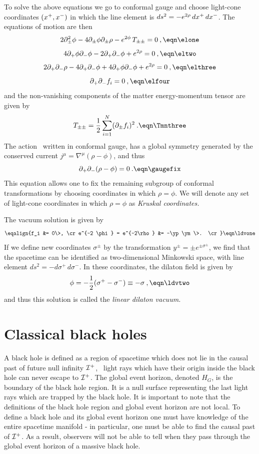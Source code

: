 To solve the above equations we go to conformal gauge and choose
light-cone
coordinates $(x^+,x^-)$ in which the line element is $ds^2 = -e^{2
\rho}\, dx^+ \, dx^-$.  The equations of motion are then
$$
2\pa_{\pm}^2 \phi
- 4\pa_{\pm} \phi\pa_{\pm} \rho
- e^{2 \phi}\, T_{\pm \pm} = 0  \>,
\eqn\elone
$$
$$
 4\pa_+ \phi\pa_- \phi
- 2 \pa_+ \pa_- \phi + e^{2 \rho} = 0  \>,
\eqn\eltwo
$$
$$
2 \pa_+ \pa_- \rho - 4 \pa_+ \pa_- \phi
+ 4\pa_+ \phi\pa_- \phi
+ e^{2 \rho} = 0  \>,
\eqn\elthree
$$
$$
\pa_+ \pa_- f_i = 0  \>,
\eqn\elfour
$$
and the non-vanishing components of the matter energy-momentum tensor
are given by
$$
T_{\pm \pm} = \half \sum_{i=1}^N (\pa_{\pm} f_i)^2  \>.
\eqn\Tmnthree
$$
The action \scghs\ written in conformal gauge, has a global symmetry
generated by the conserved current $j^{\mu} = \nabla^{\mu} (\rho -
\phi)$, and thus
$$
\pa_+ \pa_- (\rho - \phi) = 0  \>.
\eqn\gaugefix
$$
This equation allows one to fix the remaining subgroup of conformal
transformations by choosing coordinates in which $\rho = \phi.$  We
will denote any set of light-cone coordinates in which $\rho = \phi$
as {\it Kruskal coordinates.}

The vacuum solution is given by
$$
\eqalign{f_i &= 0\>, \cr
e^{-2 \phi} = e^{-2\rho} &= -\yp \ym\>. \cr}
\eqn\ldvone
$$
If we define new coordinates $\sigma^{\pm}$ by the transformation
$y^{\pm}=\pm e^{\pm \sigma^{\pm}}$, we find that the spacetime can be
identified as two-dimensional Minkowski space, with line element
$ds^2=-d\sigma^+\,d\sigma^-$.  In these coordinates, the dilaton
field is given by
$$
\phi = -\half (\sigma^+ - \sigma^-) \equiv -\sigma  \>,
\eqn\ldvtwo
$$
and thus this solution is called the {\it linear dilaton vacuum.}

\section{Classical black holes}

A black hole is defined as a region of spacetime which does not lie
in the causal past of future null infinity ${\cal I}^+$, \ie\ light rays
which have their origin inside the black hole can never escape to
${\cal I}^+$.  The global event horizon, denoted $H_G$, is the boundary
of the black hole region.  It is a null surface representing the last
light rays which are trapped by the black hole.  It is important to
note that the definitions of the black hole region and global event
horizon are not local.  To define a black hole and its global event
horizon one must have knowledge of the entire spacetime manifold - in
particular, one must be able to find the causal past of ${\cal I}^+$.  As
a result, observers will not be able to tell when they pass through
the global event horizon of a massive black hole.

